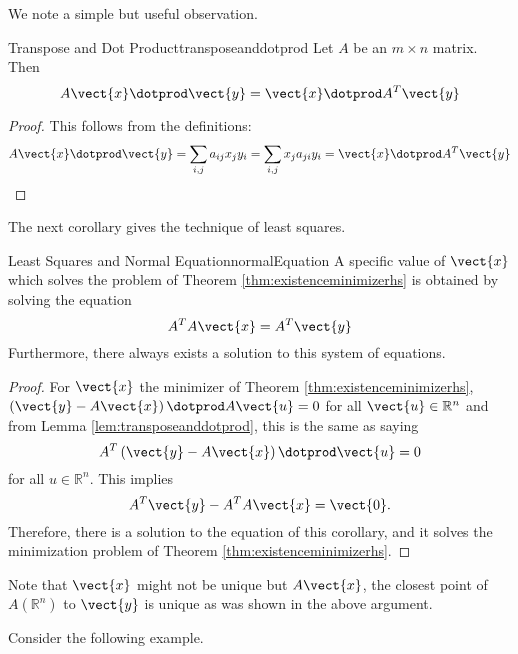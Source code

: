 We note a simple but useful observation.

\begin{lemma}{Transpose and Dot Product}{transposeanddotprod}
Let $A$ be an $m\times n$ matrix. Then 
\begin{equation*}
A\vect{x} \dotprod \vect{y} = \vect{x}\dotprod A^T\vect{y} 
\end{equation*}
\end{lemma}

\begin{proof}
This follows from the definitions:
\[ A\vect{x} \dotprod \vect{y}=\sum_{i,j}a_{ij}x_{j} y_{i}
=\sum_{i,j}x_{j} a_{ji} y_{i}= \vect{x} \dotprod A^T\vect{y}
\] \end{proof}

The next corollary gives the technique of least squares.

\begin{corollary}{Least Squares and Normal Equation}{normalEquation}
A specific value of $\vect{x}$ which solves the problem of Theorem 
\ref{thm:existenceminimizerhs} is obtained by solving the equation
\begin{equation*}
A^TA\vect{x}=A^T\vect{y}
\end{equation*}
Furthermore, there always exists a solution to this system of equations.
\end{corollary}

\begin{proof} 
For $\vect{x}$ the minimizer of Theorem \ref{thm:existenceminimizerhs}, $\left(
\vect{y}-A\vect{x}\right) \dotprod A \vect{u} =0$ for all $\vect{u} \in \mathbb{R}^{n}$ and from
Lemma \ref{lem:transposeanddotprod}, this is the same as saying
\begin{equation*}
A^T\left( \vect{y}-A\vect{x}\right) \dotprod \vect{u}=0
\end{equation*}
for all $u \in \mathbb{R}^{n}.$ This implies 
\begin{equation*}
A^T\vect{y}-A^TA\vect{x}=\vect{0}.
\end{equation*}
Therefore, there is a solution to the equation of this corollary, and it
solves the minimization problem of Theorem \ref{thm:existenceminimizerhs}.
\end{proof}

Note that $\vect{x}$ might not be unique but $A\vect{x}$, the closest
point of $A\left(\mathbb{R}^{n}\right)$ to $\vect{y}$ is unique as was shown in the
above argument. 

Consider the following example. 

